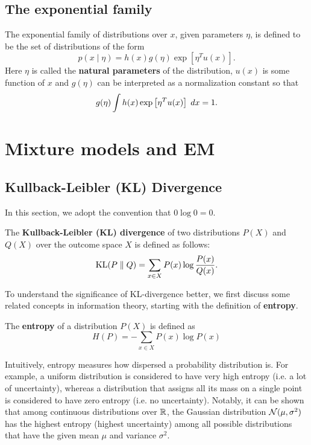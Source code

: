 \documentclass[a4paper]{article}
\begin{document}
\subsection{The exponential family}

\begin{defi}
The exponential family of distributions over $x$, 
given parameters $\eta$, is defined to be the set of 
distributions of the form
\[
p(x \mid \eta) = h(x) g(\eta) \exp \left[ \eta^T u(x) 
\right].
\]
Here $\eta$ is called the \textbf{natural parameters}
of the distribution, $u(x)$ is some function of $x$ 
and $g(\eta)$ can be interpreted as a normalization 
constant so that 
\[
g(\eta) \int h(x) \exp \left[ \eta^T u(x) \right] \; d x = 1.
\]
\end{defi}




\section{Mixture models and EM}

\subsection{Kullback-Leibler (KL) Divergence}
In this section, we adopt the convention that $0 \log 0 = 0$.

\begin{defi}[KL divergence]
  The \textbf{Kullback-Leibler (KL) divergence} of two
  distributions $P(X)$ and $Q(X)$
  over the outcome space $X$ is defined as follows:
  \[
  \operatorname{KL} (P \; \Vert \; Q) = \sum_{x \in X} P(x) \log \frac{P(x)}{Q(x)}.
  \]
\end{defi}

To understand the significance of KL-divergence better,
we first discuss some related concepts in information theory,
starting with the definition of \textbf{entropy}.
\begin{defi}
  The \textbf{entropy} of a distribution $P(X)$
  is defined as
  \[
  H(P) = - \sum_{x \in X} P(x) \log P(x)
  \]
\end{defi}

Intuitively, entropy measures how dispersed a probability
distribution is. For example, a uniform distribution is
considered to have very high entropy (i.e. a lot of uncertainty),
whereas a distribution that assigns all its mass on a single
point is considered to have zero entropy (i.e. no uncertainty).
Notably, it can be shown that among continuous distributions
over $\mathbb{R}$, the Gaussian distribution $\mathcal{N}(\mu, \sigma^2)$ has
the highest entropy (highest uncertainty) among all possible
distributions that have the given mean $\mu$ and variance $\sigma^2$.
\end{document}
